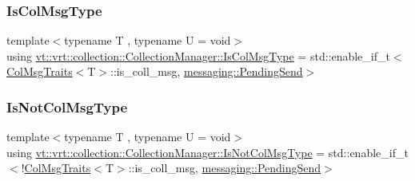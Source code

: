 \subsubsection{\texorpdfstring{Is\+Col\+Msg\+Type}{IsColMsgType}}
{\footnotesize\ttfamily template$<$typename T , typename U  = void$>$ \\
using \hyperlink{structvt_1_1vrt_1_1collection_1_1_collection_manager_a21c21612c806016788057aeab142af20}{vt\+::vrt\+::collection\+::\+Collection\+Manager\+::\+Is\+Col\+Msg\+Type} =  std\+::enable\+\_\+if\+\_\+t$<$\hyperlink{structvt_1_1vrt_1_1collection_1_1_col_msg_traits}{Col\+Msg\+Traits}$<$T$>$\+::is\+\_\+coll\+\_\+msg, \hyperlink{structvt_1_1messaging_1_1_pending_send}{messaging\+::\+Pending\+Send}$>$}

\mbox{\label{structvt_1_1vrt_1_1collection_1_1_collection_manager_ae376deeefd4f89a0b1c93849977715d9}} 
\subsubsection{\texorpdfstring{Is\+Not\+Col\+Msg\+Type}{IsNotColMsgType}}
{\footnotesize\ttfamily template$<$typename T , typename U  = void$>$ \\
using \hyperlink{structvt_1_1vrt_1_1collection_1_1_collection_manager_ae376deeefd4f89a0b1c93849977715d9}{vt\+::vrt\+::collection\+::\+Collection\+Manager\+::\+Is\+Not\+Col\+Msg\+Type} =  std\+::enable\+\_\+if\+\_\+t$<$!\hyperlink{structvt_1_1vrt_1_1collection_1_1_col_msg_traits}{Col\+Msg\+Traits}$<$T$>$\+::is\+\_\+coll\+\_\+msg, \hyperlink{structvt_1_1messaging_1_1_pending_send}{messaging\+::\+Pending\+Send}$>$}

\mbox{\label{structvt_1_1vrt_1_1collection_1_1_collection_manager_a18e3a17d9eb086c6c2f499242b7faa1e}} 
